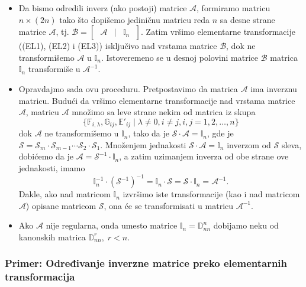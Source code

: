 \documentclass[a4paper,12pt,twoside]{report}
\numberwithin{algorithm}{section}
\begin{document}
\begin{itemize}
    \item Da bismo odredili inverz (ako postoji) matrice $\mathcal{A}$, formiramo matricu $n \times (2n)$ tako što dopišemo jediničnu matricu reda $n$ sa desne 
    strane matrice $\mathcal{A}$, tj. \linebreak $\mathcal{B} = \begin{bmatrix}
        \;\mathcal{A}&|&\mathbb{I}_n\;
    \end{bmatrix}$. Zatim vršimo elementarne transformacije ((EL1), (EL2) i (EL3)) isključivo nad vrstama matrice $\mathcal{B}$, dok ne transformišemo $\mathcal{A}$
    u $\mathbb{I}_n$. Istoveremeno se u desnoj polovini matrice $\mathcal{B}$ matrica $\mathbb{I}_n$ transformiše u $\mathcal{A}^{-1}$.

    \item Opravdajmo sada ovu proceduru. Pretpostavimo da matrica $\mathcal{A}$ ima inverznu matricu. Budući da vršimo elementarne transformacije nad vrstama matrice
    $\mathcal{A}$, matricu $\mathcal{A}$ množimo sa leve strane nekim od matrica iz skupa 
    \[\{\mathbb{F}_{i,\lambda}, \mathbb{G}_{ij}, \mathbb{E}'_{ij} \mid \lambda \neq 0, i \neq j, i,j = 1,2,\dots,n\}\]
    dok $\mathcal{A}$ ne transformišemo u $\mathbb{I}_n$, tako da je $\mathcal{S} \cdot \mathcal{A} = \mathbb{I}_n$, gde je $\mathcal{S} = \mathcal{S}_m \cdot \mathcal{S}_{m-1} \cdots \mathcal{S}_2 \cdot \mathcal{S}_1$.
    Množenjem jednakosti $\mathcal{S} \cdot \mathcal{A} = \mathbb{I}_n$ inverzom od $\mathcal{S}$ sleva, dobićemo da je $\mathcal{A} = \mathcal{S}^{-1} \cdot \mathbb{I}_n$, a zatim uzimanjem inverza od obe strane ove 
    jednakosti, imamo \[\mathbb{I}_n^{-1} \cdot (\mathcal{S}^{-1})^{-1} = \mathbb{I}_n \cdot \mathcal{S} = \mathcal{S} \cdot \mathbb{I}_n = \mathcal{A}^{-1}.\] Dakle, ako nad matricom $\mathbb{I}_n$ izvršimo iste 
    transformacije (kao i nad matricom $\mathcal{A}$) opisane matricom $\mathcal{S}$, ona će se transformisati u matricu $\mathcal{A}^{-1}$.
    \item Ako $\mathcal{A}$ nije regularna, onda umesto matrice $\mathbb{I}_n = \mathbb{D}_{nn}^n$ dobijamo neku od kanonskih matrica $\mathbb{D}_{nn}^r, \; r < n$. 
\end{itemize}

\subsubsection*{Primer: Određivanje inverzne matrice preko elementarnih transformacija}
\end{document}
